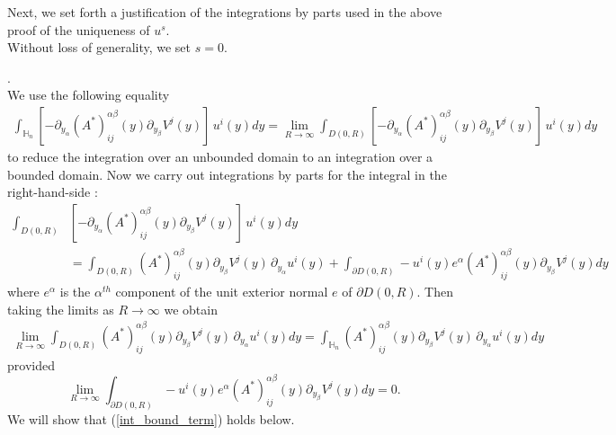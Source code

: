 \documentclass[11pt, reqno]{amsart}
\theoremstyle{definition}
\theoremstyle{remark}
\numberwithin{equation}{section}
\begin{document}
\begin{appendices}
	
		\noindent	Next, we set forth a justification of  the  integrations by parts used in the above proof of the uniqueness of $u^s$.\\
		
	
		
		\noindent   Without loss of generality, we set $s=0$.
		
		.\\
		We use the following equality
		\begin{align*}
			\int_{  \mathbb{H}_n } [-\partial_{y_\alpha} (A^*)^{\alpha\beta}_{ij}(y) \partial_{y_\beta} V^j(y)  ]\,  u^i(y)  dy = \lim_{R\rightarrow\infty} \int_{D(0,R)} [-\partial_{y_\alpha} (A^*)^{\alpha\beta}_{ij}(y) \partial_{y_\beta} V^j(y)  ]\,  u^i(y) dy
		\end{align*}
	to reduce the integration over an unbounded domain to an integration over a bounded domain. Now we carry out integrations by parts for the integral in the right-hand-side :
		\begin{align*}
			\int_{D(0,R)}& [-\partial_{y_\alpha} (A^*)^{\alpha\beta}_{ij}(y) \partial_{y_\beta} V^j(y)  ]\,  u^i(y)  dy\\ &= 	\int_{D(0,R)}  (A^*)^{\alpha\beta}_{ij}(y) \partial_{y_\beta} V^j(y)  \, \partial_{y_\alpha} u^i(y)   + 	\int_{\partial D(0,R) }  -u^i(y)e^\alpha (A^*)^{\alpha\beta}_{ij}(y) \partial_{y_\beta} V^j(y) dy
		\end{align*} where $e^\alpha$ is the $\alpha^{th}$ component of the unit exterior normal $e$ of $\partial D(0,R)$.	Then taking the limits as $R\rightarrow\infty$ we obtain
		\begin{align*}
			\lim_{R\rightarrow\infty} 	\int_{D(0,R)} (A^*)^{\alpha\beta}_{ij}(y) \partial_{y_\beta} V^j(y)  \, \partial_{y_\alpha} u^i(y) dy  = \int_{    \mathbb{H}_n}  (A^*)^{\alpha\beta}_{ij}(y) \partial_{y_\beta} V^j(y)  \, \partial_{y_\alpha} u^i(y)dy
		\end{align*}
		provided
		\begin{equation}\label{int_bound_term}
			\lim_{R\rightarrow\infty} 	\int_{\partial D(0,R) }  -  u^i(y)e^\alpha (A^*)^{\alpha\beta}_{ij}(y) \partial_{y_\beta} V^j(y) dy = 0.
		\end{equation}
	We will show that (\ref{int_bound_term}) holds below.\\
		

\end{appendices}
\end{document}
